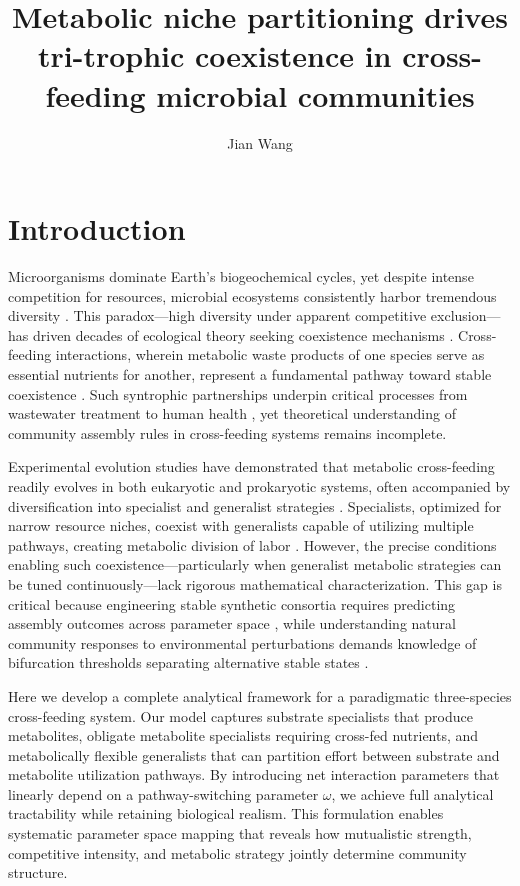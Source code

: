 \documentclass[9pt,twocolumn]{pnas-new}
\title{Metabolic niche partitioning drives tri-trophic coexistence in cross-feeding microbial communities}
\author[a]{Jian Wang}
\affil[a]{Department of Mathematics and Biological Sciences, [Institution Name]}
\begin{document}
\maketitle
\thispagestyle{firststyle}

\section*{Introduction}

Microorganisms dominate Earth's biogeochemical cycles, yet despite intense competition for resources, microbial ecosystems consistently harbor tremendous diversity \cite{hug2016new,louca2016decoupling}. This paradox—high diversity under apparent competitive exclusion—has driven decades of ecological theory seeking coexistence mechanisms \cite{hutchinson1961paradox,hardin1960competitive}. Cross-feeding interactions, wherein metabolic waste products of one species serve as essential nutrients for another, represent a fundamental pathway toward stable coexistence \cite{ponomarova2015metabolic,goldford2018emergent}. Such syntrophic partnerships underpin critical processes from wastewater treatment to human health \cite{embree2015networks,harcombe2014metabolic}, yet theoretical understanding of community assembly rules in cross-feeding systems remains incomplete.

Experimental evolution studies have demonstrated that metabolic cross-feeding readily evolves in both eukaryotic \cite{shou2007synthetic,waite2015adaptation} and prokaryotic \cite{rosenzweig2013microbial,mccully2017emergence} systems, often accompanied by diversification into specialist and generalist strategies \cite{garcia2021eco,goldford2018emergent}. Specialists, optimized for narrow resource niches, coexist with generalists capable of utilizing multiple pathways, creating metabolic division of labor \cite{harcombe2014metabolic,ziesack2019engineered}. However, the precise conditions enabling such coexistence—particularly when generalist metabolic strategies can be tuned continuously—lack rigorous mathematical characterization. This gap is critical because engineering stable synthetic consortia requires predicting assembly outcomes across parameter space \cite{kong2018designing,liu2018coupling}, while understanding natural community responses to environmental perturbations demands knowledge of bifurcation thresholds separating alternative stable states \cite{scheffer2001catastrophic,dai2013niche}.

Here we develop a complete analytical framework for a paradigmatic three-species cross-feeding system. Our model captures substrate specialists that produce metabolites, obligate metabolite specialists requiring cross-fed nutrients, and metabolically flexible generalists that can partition effort between substrate and metabolite utilization pathways. By introducing net interaction parameters that linearly depend on a pathway-switching parameter $\omega$, we achieve full analytical tractability while retaining biological realism. This formulation enables systematic parameter space mapping that reveals how mutualistic strength, competitive intensity, and metabolic strategy jointly determine community structure.
\end{document}
